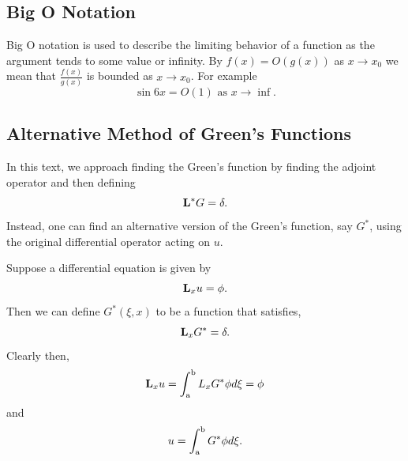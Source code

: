 \subsection{Big O Notation} \label{sec:BigO}
Big O notation is used to describe the limiting behavior of a function as the argument tends to some value or infinity. By \(f(x)=O(g(x))\) as \(x\to x_0\) we mean that \(\frac{f(x)}{g(x)}\) is bounded as \(x\to x_0\). For example 
\begin{equation*}
    \sin 6x = O(1) \text{ as } x\to \inf.
\end{equation*}

\subsection{Alternative Method of Green's Functions}
In this text, we approach finding the Green's function by finding the adjoint operator and then defining 
\begin{equation*}
    \mathrm{\bf{L^*}} G = \delta.
\end{equation*}
Instead, one can find an alternative version of the Green's function, say \(G^*\), using the original differential operator acting on \(u\). 

Suppose a differential equation is given by
\begin{equation*}
    \mathrm{\bf{L}}_x u = \phi.
\end{equation*}
Then we can define \(G^*(\xi,x)\) to be a function that satisfies,
\begin{equation*}
    \mathrm{\bf{L}}_x G^* = \delta.
\end{equation*}
Clearly then,
\begin{equation*}
    \mathrm{\bf{L}}_x u = \int_\mathrm{a}^\mathrm{b} L_xG^*\phi d\xi = \phi
\end{equation*}
and
\begin{equation*}
    u = \int_\mathrm{a}^\mathrm{b} G^* \phi d\xi.
\end{equation*}